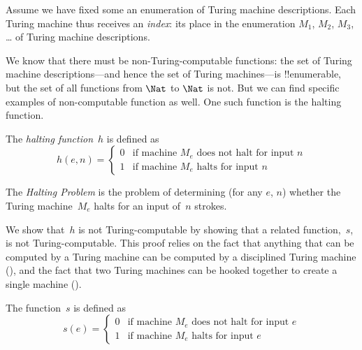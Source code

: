 \documentclass[../../../include/open-logic-section]{subfiles}
\begin{document}

\begin{explain}
Assume we have fixed some an enumeration of Turing machine
descriptions.  Each Turing machine thus receives an \emph{index}: its
place in the enumeration $M_1$, $M_2$, $M_3$, \dots{} of Turing machine
descriptions.

We know that there must be non-Turing-computable functions: the set of
Turing machine descriptions---and hence the set of Turing machines---is
!!{enumerable}, but the set of all functions from $\Nat$ to $\Nat$ is
not. But we can find specific examples of non-computable function as
well. One such function is the halting function.
\end{explain}

\begin{defn}
 The \emph{halting function}~$h$ is defined as
\[
h(e,n) =
\begin{cases}
  \text{0} & \text{if machine~$M_e$ does not halt for input $n$} \\
  \text{1} & \text{if machine~$M_e$ halts for input $n$}
\end{cases}
\]
\end{defn}

\begin{defn}
The \emph{Halting Problem} is the problem of determining (for any $e$, $n$)
whether the Turing machine~$M_e$ halts for an input of~$n$ strokes.
\end{defn}

\begin{explain}
We show that~$h$ is not Turing-computable by showing that a related
function,~$s$, is not Turing-computable. This proof relies on the fact
that anything that can be computed by a Turing machine can be computed
by a disciplined Turing machine (), and the fact
that two Turing machines can be hooked together to create a single
machine ().
\end{explain}

\begin{defn} The function~$s$ is defined as
\[
s(e) =
\begin{cases}
  \text{0} & \text{if machine~$M_e$ does not halt for input $e$} \\
  \text{1} & \text{if machine~$M_e$ halts for input $e$}
\end{cases}
\]
\end{defn}
\end{document}
